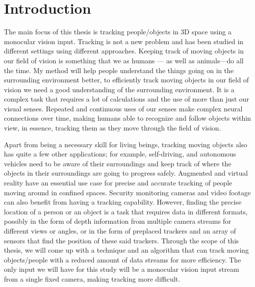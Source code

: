 \chapter{Introduction}


The main focus of this thesis is tracking people/objects in 3D space using a monocular vision input. Tracking is not a new problem and has been studied in different settings using different approaches. Keeping track of moving objects in our field of vision is something that we as humans — as well as animals—do all the time. My method will help people understand the things going on in the surrounding environment better, to efficiently track moving objects in our field of vision we need a good understanding of the surrounding environment. It is a complex task that requires a lot of calculations and the use of more than just our visual senses. Repeated and continuous uses of our senses make complex neural connections over time, making humans able to recognize and follow objects within view, in essence, tracking them as they move through the field of vision.\newline

Apart from being a necessary skill for living beings, tracking moving objects also has quite a few other applications; for example, self-driving, and autonomous vehicles need to be aware of their surroundings and keep track of where the objects in their surroundings are going to progress safely. Augmented and virtual reality have an essential use case for precise and accurate tracking of people moving around in confined spaces. Security monitoring cameras and video footage can also benefit from having a tracking capability. However, finding the precise location of a person or an object is a task that requires data in different formats, possibly in the form of depth information from multiple camera streams for different views or angles, or in the form of preplaced trackers and an array of sensors that find the position of these said trackers. Through the scope of this thesis, we will come up with a technique and an algorithm that can track moving objects/people with a reduced amount of data streams for more efficiency. The only input we will have for this study will be a monocular vision input stream from a single fixed camera, making tracking more difficult.\newline

